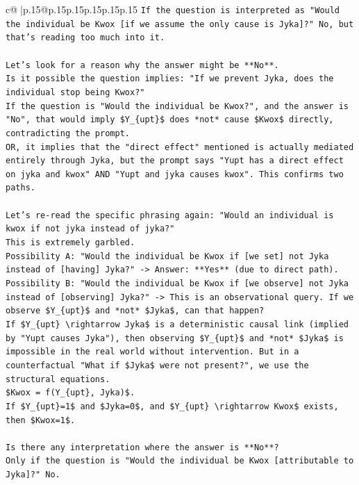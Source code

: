 \documentclass{article}
\begin{document}
{\begin{supertabular}{c@{$\;$}|p{.15\linewidth}@{}p{.15\linewidth}p{.15\linewidth}p{.15\linewidth}p{.15\linewidth}p{.15\linewidth}}
{{{\texttt{If the question is interpreted as "Would the individual be Kwox {[}if we assume the only cause is Jyka{]}?" No, but that's reading too much into it.} \\
\\ 
\texttt{Let's look for a reason why the answer might be **No**.} \\
\texttt{Is it possible the question implies: "If we prevent Jyka, does the individual stop being Kwox?"} \\
\texttt{If the question is "Would the individual be Kwox?", and the answer is "No", that would imply \$Y\_\{upt\}\$ does *not* cause \$Kwox\$ directly, contradicting the prompt.} \\
\texttt{OR, it implies that the "direct effect" mentioned is actually mediated entirely through Jyka, but the prompt says "Yupt has a direct effect on jyka and kwox" AND "Yupt and jyka causes kwox". This confirms two paths.} \\
\\ 
\texttt{Let's re{-}read the specific phrasing again: "Would an individual is kwox if not jyka instead of jyka?"} \\
\texttt{This is extremely garbled.} \\
\texttt{Possibility A: "Would the individual be Kwox if {[}we set{]} not Jyka instead of {[}having{]} Jyka?" {-}> Answer: **Yes** (due to direct path).} \\
\texttt{Possibility B: "Would the individual be Kwox if {[}we observe{]} not Jyka instead of {[}observing{]} Jyka?" {-}> This is an observational query. If we observe \$Y\_\{upt\}\$ and *not* \$Jyka\$, can that happen?} \\
\texttt{If \$Y\_\{upt\} \textbackslash{}rightarrow Jyka\$ is a deterministic causal link (implied by "Yupt causes Jyka"), then observing \$Y\_\{upt\}\$ and *not* \$Jyka\$ is impossible in the real world without intervention. But in a counterfactual "What if \$Jyka\$ were not present?", we use the structural equations.} \\
\texttt{\$Kwox = f(Y\_\{upt\}, Jyka)\$.} \\
\texttt{If \$Y\_\{upt\}=1\$ and \$Jyka=0\$, and \$Y\_\{upt\} \textbackslash{}rightarrow Kwox\$ exists, then \$Kwox=1\$.} \\
\\ 
\texttt{Is there any interpretation where the answer is **No**?} \\
\texttt{Only if the question is "Would the individual be Kwox {[}attributable to Jyka{]}?" No.} \\
}}}
\end{supertabular}}
\end{document}
